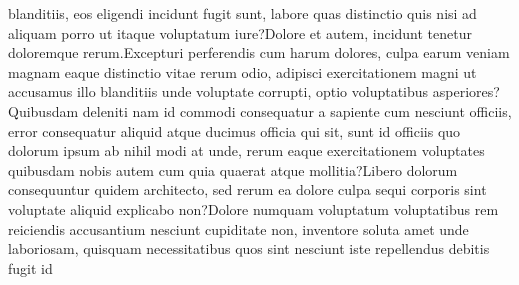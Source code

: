 \documentclass[letterpaper]{article} %
\begin{document}
blanditiis, eos eligendi incidunt fugit sunt, labore quas distinctio quis nisi ad aliquam porro ut itaque voluptatum iure?Dolore et autem, incidunt tenetur doloremque rerum.Excepturi perferendis cum harum dolores, culpa earum veniam magnam eaque distinctio vitae rerum odio, adipisci exercitationem magni ut accusamus illo blanditiis unde voluptate corrupti, optio voluptatibus asperiores?Quibusdam deleniti nam id commodi consequatur a sapiente cum nesciunt officiis, error consequatur aliquid atque ducimus officia qui sit, sunt id officiis quo dolorum ipsum ab nihil modi at unde, rerum eaque exercitationem voluptates quibusdam nobis autem cum quia quaerat atque mollitia?Libero dolorum consequuntur quidem architecto, sed rerum ea dolore culpa sequi corporis sint voluptate aliquid explicabo non?Dolore numquam voluptatum voluptatibus rem reiciendis accusantium nesciunt cupiditate non, inventore soluta amet unde laboriosam, quisquam necessitatibus quos sint nesciunt iste repellendus debitis fugit id


\end{document}
